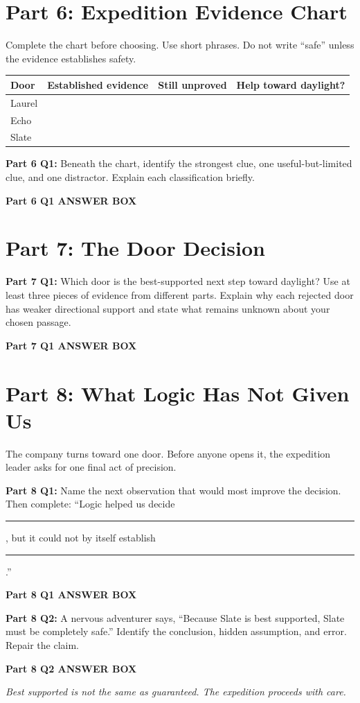 \documentclass[12pt]{article}
\newcommand{\answerbox}[2]{%
\vspace{0.12em}\noindent\textbf{#1}\par\vspace{0.04em}
\noindent\fbox{\begin{minipage}[t][#2]{\dimexpr\textwidth-2\fboxsep-2\fboxrule}\rule{\textwidth}{0pt}\vspace{#2}\end{minipage}}\par\vspace{0.22em}}
\begin{document}
\newpage

\section*{Part 6: Expedition Evidence Chart}

Complete the chart before choosing. Use short phrases. Do not write ``safe'' unless the evidence establishes safety.

\renewcommand{\arraystretch}{1.5}
\begin{tabular}{|p{}|p{}|p{}|p{}|}
\hline
\textbf{Door} & \textbf{Established evidence} & \textbf{Still unproved} & \textbf{Help toward daylight?}\\ \hline
Laurel & & & \\[0.52in] \hline
Echo & & & \\[0.52in] \hline
Slate & & & \\[0.52in] \hline
\end{tabular}

\vspace{0.35em}
\textbf{Part 6 Q1:} Beneath the chart, identify the strongest clue, one useful-but-limited clue, and one distractor. Explain each classification briefly.

\answerbox{Part 6 Q1 ANSWER BOX}{1.75in}

\newpage

\section*{Part 7: The Door Decision}

\textbf{Part 7 Q1:} Which door is the best-supported next step toward daylight? Use at least three pieces of evidence from different parts. Explain why each rejected door has weaker directional support and state what remains unknown about your chosen passage.

\answerbox{Part 7 Q1 ANSWER BOX}{2.3in}

\newpage

\section*{Part 8: What Logic Has Not Given Us}

The company turns toward one door. Before anyone opens it, the expedition leader asks for one final act of precision.

\textbf{Part 8 Q1:} Name the next observation that would most improve the decision. Then complete: ``Logic helped us decide \rule{1.6in}{0.4pt}, but it could not by itself establish \rule{1.6in}{0.4pt}.''

\answerbox{Part 8 Q1 ANSWER BOX}{2.2in}

\textbf{Part 8 Q2:} A nervous adventurer says, ``Because Slate is best supported, Slate must be completely safe.'' Identify the conclusion, hidden assumption, and error. Repair the claim.

\answerbox{Part 8 Q2 ANSWER BOX}{2.2in}

\vfill
\begin{center}\textit{Best supported is not the same as guaranteed. The expedition proceeds with care.}\end{center}
\end{document}

